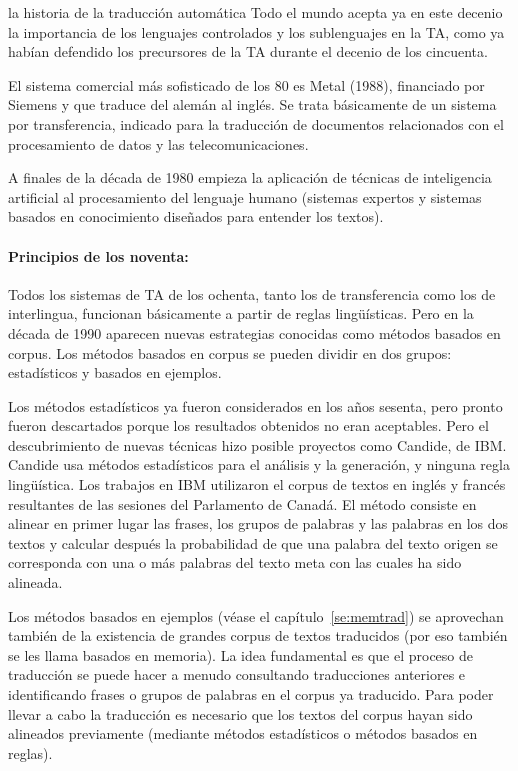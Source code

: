 \begin{persabermes}{la historia de la traducción automática}
Todo el mundo acepta ya en este decenio la importancia de los lenguajes controlados y los sublenguajes en la TA, como ya habían defendido los precursores de la TA durante el decenio de los cincuenta. 

El sistema comercial más sofisticado de los 80 es Metal (1988), financiado por Siemens y que traduce del alemán al inglés. Se trata básicamente de un sistema por transferencia, indicado para la traducción de documentos relacionados con el procesamiento de datos y las telecomunicaciones. 

A finales de la década de 1980 empieza la aplicación de técnicas de inteligencia artificial al procesamiento del lenguaje humano (sistemas expertos y sistemas basados en conocimiento diseñados para entender los textos). 

\paragraph{Principios de los noventa:} Todos los sistemas de TA de los ochenta, tanto los de transferencia como los de interlingua, funcionan básicamente a partir de reglas lingüísticas. Pero en la década de 1990 aparecen nuevas estrategias conocidas como métodos basados en corpus. Los métodos basados en corpus se pueden dividir en dos grupos: estadísticos y basados en ejemplos. 

Los métodos estadísticos ya fueron considerados en los años sesenta, pero pronto fueron descartados porque los resultados obtenidos no eran aceptables. Pero el descubrimiento de nuevas técnicas hizo posible proyectos como Candide, de IBM. Candide usa métodos estadísticos para el análisis y la generación, y ninguna regla lingüística. Los trabajos en IBM utilizaron el corpus de textos en inglés y francés resultantes de las sesiones del Parlamento de Canadá. El método consiste en alinear en primer lugar las frases, los grupos de palabras y las palabras en los dos textos y calcular después la probabilidad de que una palabra del texto origen se corresponda con una o más palabras del texto meta con las cuales ha sido alineada. 

Los métodos basados en ejemplos (véase el capítulo~\ref{se:memtrad}) se aprovechan también de la existencia de grandes corpus de textos traducidos (por eso también se les llama basados en memoria). La idea fundamental es que el proceso de traducción se puede hacer a menudo consultando traducciones anteriores e identificando frases o grupos de palabras en el corpus ya traducido. Para poder llevar a cabo la traducción es necesario que los textos del corpus hayan sido alineados previamente (mediante métodos estadísticos o métodos basados en reglas). 


\end{persabermes}
